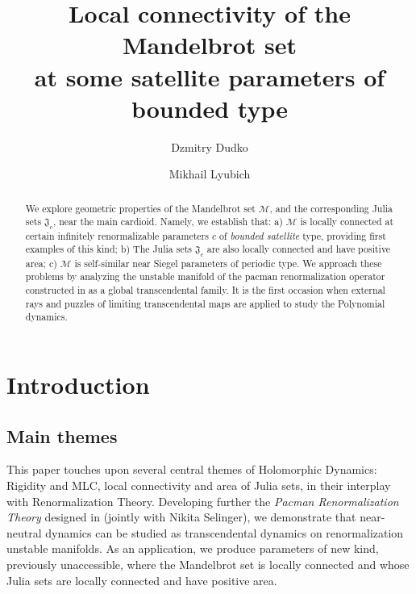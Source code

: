 \documentclass{amsart}
\newcommand{\1}{{\mathbb 1 }}
\newcommand{\Mandel}{{\mathcal{M}}}
\newcommand\Jul{{\mathfrak J}}
\theoremstyle{remark}
\numberwithin{equation}{section}
\theoremstyle{definition}
\theoremstyle{nonumberbreak}
\begin{document}
\title[MLC at satellite parameters]{Local connectivity of the Mandelbrot set\\ at some satellite parameters of bounded type}
\author{Dzmitry Dudko}
\author{Mikhail Lyubich}


\begin{abstract}

We explore geometric properties of the Mandelbrot set $\Mandel$, 
and the corresponding Julia sets $\Jul_c$,   near the main cardioid.
Namely, we establish that:  a)  $\Mandel$ is  locally connected  at certain infinitely renormalizable parameters $c$ of \emph{bounded satellite} type,  providing first examples of this kind; b) The Julia sets $\Jul_c$ are also locally connected
and have positive area; c) $\Mandel$ is self-similar  near  Siegel parameters of periodic type.  We approach these problems by analyzing the unstable manifold of the pacman renormalization operator constructed in \cite{DLS} as a global
transcendental family. It is the first occasion when external rays and puzzles of limiting transcendental maps are applied to study the Polynomial dynamics.

\end{abstract}
\maketitle


\setcounter{tocdepth}{1}


\tableofcontents



\section{Introduction}


\subsection{Main themes }
This paper touches upon several central themes of Holomorphic Dynamics:
Rigidity and MLC,  local connectivity and area of Julia sets, in their interplay with  Renormalization Theory. Developing further 
the {\em  Pacman Renormalization Theory} 
designed in \cite{DLS} (jointly with Nikita Selinger), we demonstrate that near-neutral dynamics can be studied as transcendental dynamics on renormalization unstable manifolds. As an application, we produce parameters of new kind, previously unaccessible,
where the Mandelbrot set is locally connected and whose Julia sets 
are locally connected and have positive area. 
\end{document}
